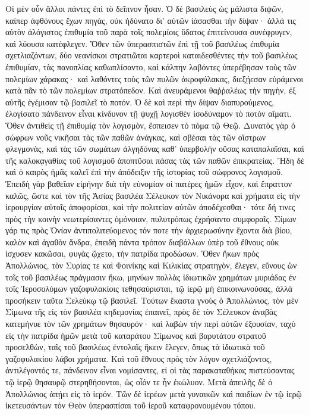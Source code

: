 Οἱ μὲν οὖν ἄλλοι πάντες ἐπὶ τὸ δεῖπνον ἦσαν. 
Ὁ δὲ βασιλεὺς ὡς μάλιστα διψῶν, καίπερ ἀφθόνους ἔχων πηγὰς, οὐκ ἠδύνατο δι' αὐτῶν ἰάσασθαι τὴν δίψαν· 
ἀλλά τις αὐτὸν ἀλόγιστος ἐπιθυμία τοῦ παρὰ τοῖς πολεμίοις ὕδατος ἐπιτείνουσα συνέφρυγεν, καὶ λύουσα κατέφλεγεν. 
Ὅθεν τῶν ὑπερασπιστῶν ἐπὶ τῇ τοῦ βασιλέως ἐπιθυμία σχετλιαζόντων, δύο νεανίσκοι στρατιῶται καρτεροὶ καταιδεσθέντες τὴν τοῦ βασιλέως ἐπιθυμίαν, τὰς πανοπλίας καθωπλίσαντο, καὶ κάλπην λαβόντες ὑπερέβησαν τοὺς τῶν πολεμίων χάρακας· 
καὶ λαθόντες τοὺς τῶν πυλῶν ἀκροφύλακας, διεξῄεσαν εὑράμενοι κατὰ πᾶν τὸ τῶν πολεμίων στρατόπεδον. 
Καὶ ἀνευράμενοι θαῤῥαλέως τὴν πηγὴν, ἐξ αὐτῆς ἐγέμισαν τῷ βασιλεῖ τὸ ποτόν. 
Ὁ δὲ καὶ περὶ τὴν δίψαν διαπυρούμενος, ἐλογίσατο πάνδεινον εἶναι κίνδυνον τῇ ψυχῇ λογισθὲν ἰσοδύναμον τὸ ποτὸν αἵματι. 
Ὅθεν ἀντιθεὶς τῇ ἐπιθυμίᾳ τὸν λογισμὸν, ἔσπεισεν τὸ πόμα τῷ Θεῷ. 
Δυνατὸς γὰρ ὁ σώφρων νοῦς νικῆσαι τὰς τῶν παθῶν ἀνάγκας, καὶ σβέσαι τὰς τῶν οἴστρων φλεγμονὰς, καὶ τὰς τῶν σωμάτων ἀλγηδόνας καθ' ὑπερβολὴν οὔσας καταπαλαῖσαι, 
καὶ τῆς καλοκᾳγαθίας τοῦ λογισμοῦ ἀποπτῦσαι πάσας τὰς τῶν παθῶν ἐπικρατείας. 
Ἤδη δὲ καὶ ὁ καιρὸς ἡμᾶς καλεῖ ἐπὶ τὴν ἀπόδειξιν τῆς ἱστορίας τοῦ σώφρονος λογισμοῦ. 
Ἐπειδὴ γὰρ βαθεῖαν εἰρήνην διὰ τὴν εὐνομίαν οἱ πατέρες ἡμῶν εἶχον, καὶ ἔπραττον καλῶς, ὥστε καὶ τὸν τῆς Ἀσίας βασιλέα Σέλευκον τὸν Νικάνορα καὶ χρήματα εἰς τὴν ἱερουργίαν αὐτοῖς ἀποφορίσαι, καὶ τὴν πολιτείαν αὐτῶν ἀποδέχεσθαι· 
τότε δή τινες πρὸς τὴν κοινὴν νεωτερίσαντες ὁμόνοιαν, πυλυτρόπως ἐχρήσαντο συμφοραῖς. 
Σίμων γάρ τις πρὸς Ὀνίαν ἀντιπολιτεύομενος τόν ποτε τὴν ἀρχιερωσύνην ἔχοντα διὰ βίου, καλὸν καὶ ἀγαθὸν ἄνδρα, ἐπειδὴ πάντα τρόπον διαβάλλων ὑπὲρ τοῦ ἔθνους οὐκ ἰσχυσεν κακῶσαι, φυγὰς ᾤχετο, τὴν πατρίδα προδώσων. 
Ὅθεν ἥκων πρὸς Ἀπολλώνιος, τὸν Συρίας τε καὶ Φοινίκης καὶ Κιλικίας στρατηγὸν, ἔλεγεν, 
εὔνους ὢν τοῖς τοῦ βασιλέως πράγμασιν ἥκω, μηνύων πολλὰς ἰδιωτικῶν χρημάτων μυριάδας ἐν τοῖς Ἱεροσολύμων γαζοφυλακίοις τεθησαύρισται, τῷ ἱερῷ μὴ ἐπικοινωνούσας, ἀλλὰ προσήκειν ταῦτα Σελεύκῳ τῷ βασιλεῖ. 
Τούτων ἕκαστα γνοὺς ὁ Ἀπολλώνιος, τὸν μὲν Σίμωνα τῆς εἰς τὸν βασιλέα κηδεμονίας ἐπαινεῖ, πρὸς δὲ τὸν Σέλευκον ἀναβὰς κατεμήνυε τὸν τῶν χρημάτων θησαυρόν· 
καὶ λαβὼν τὴν περὶ αὐτῶν ἐξουσίαν, ταχὺ εἰς τὴν πατρίδα ἡμῶν μετὰ τοῦ καταράτου Σίμωνος καὶ βαρυτάτου στρατοῦ προσελθὼν, 
ταῖς τοῦ βασιλέως ἐντολαῖς ἥκειν ἔλεγεν, ὅπως τὰ ἰδιωτικὰ τοῦ γαζοφυλακίου λάβοι χρήματα. 
Καὶ τοῦ ἔθνους πρὸς τὸν λόγον σχετλιάζοντος, ἀντιλέγοντός τε, πάνδεινον εἶναι νομίσαντες, εἰ οἱ τὰς παρακαταθήκας πιστεύσαντας τῷ ἱερῷ θησαυρῷ στερηθήσονται, ὡς οἷόν τε ἦν ἐκώλυον. 
Μετὰ ἀπειλῆς δὲ ὁ Ἀπολλώνιος ἀπῄει εἰς τὸ ἱερόν. 
Τῶν δὲ ἱερέων μετὰ γυναικῶν καὶ παιδίων ἐν τῷ ἱερῷ ἱκετευσάντων τὸν Θεὸν ὑπερασπίσαι τοῦ ἱεροῦ καταφρονουμένου τόπου. 
